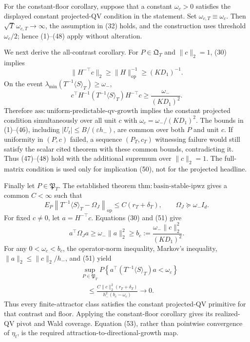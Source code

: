 For the constant-floor corollary, suppose that a constant \(\omega_c>0\) satisfies the displayed constant projected-QV condition in the statement. Set \(\omega_{c,T}\equiv\omega_c\). Then \(\sqrt T\,\omega_{c,T}\to\infty\), the assumption in (32) holds, and the construction uses threshold \(\omega_c/2\); hence (1)--(48) apply without alteration.

We next derive the all-contrast corollary. For \(P\in\mathfrak Q_T\) and \(\|c\|_2=1\), (30) implies
\[
 \|H^{-\top}c\|_2\ge\|H\|_{\mathrm{op}}^{-1}
 \ge(KD_1)^{-1}.
\tag{49}
\]
On the event \(\lambda_{\min}(T^{-1}\langle S\rangle_T)\ge\omega_-\),
\[
 c^\top H^{-1}(T^{-1}\langle S\rangle_T)H^{-\top}c
 \ge\frac{\omega_-}{(KD_1)^2}.
\tag{50}
\]
Therefore \(\mathrm{ass:uniform\text{-}predictable\text{-}qv\text{-}growth}\) implies the constant projected condition simultaneously over all unit \(c\) with \(\omega_c=\omega_-/(KD_1)^2\). The bounds in (1)--(46), including \(|U_t|\le B/(\varepsilon h_-)\), are common over both \(P\) and unit \(c\). If uniformity in \((P,c)\) failed, a sequence \((P_T,c_T)\) witnessing failure would still satisfy the scalar cited theorem with these common bounds, contradicting it. Thus (47)--(48) hold with the additional supremum over \(\|c\|_2=1\). The full-matrix condition is used only for implication (50), not for the projected headline.

Finally let \(P\in\mathfrak P_T\). The established theorem \(\mathrm{thm:basin\text{-}stable\text{-}ipwz}\) gives a common \(C<\infty\) such that
\[
 E_P\left\|T^{-1}\langle S\rangle_T-\Omega_J\right\|_{\mathrm{op}}
 \le C(r_T+\delta_T),
 \qquad \Omega_J\succeq\omega_-I_d.
\tag{51}
\]
For fixed \(c\ne0\), let \(a=H^{-\top}c\). Equations (30) and (51) give
\[
 a^\top\Omega_Ja
 \ge\omega_-\|a\|_2^2
 \ge b_c:=\frac{\omega_-\|c\|_2^2}{(KD_1)^2}.
\tag{52}
\]
For any \(0<\omega_c<b_c\), the operator-norm inequality, Markov's inequality, \(\|a\|_2\le\|c\|_2/h_-\), and (51) yield
\[
 \begin{aligned}
 &\sup_{P\in\mathfrak P_T}
 P\!\left\{a^\top(T^{-1}\langle S\rangle_T)a<\omega_c\right\}\\
 &\quad\le
 \frac{C\|c\|_2^2(r_T+\delta_T)}
 {h_-^2(b_c-\omega_c)}\longrightarrow0.
 \end{aligned}
\tag{53}
\]
Thus every finite-attractor class satisfies the constant projected-QV primitive for that contrast and floor. Applying the constant-floor corollary gives its realized-QV pivot and Wald coverage. Equation (53), rather than pointwise convergence of \(\eta_t\), is the required attraction-to-directional-growth map.